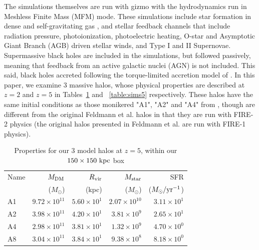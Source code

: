 The simulations themselves are run with {\sc gizmo} \citep{Hopkins2015} with the hydrodynamics run in Meshless Finite Mass (MFM) mode.
These simulations include star formation in dense and self-gravitating gas \citep{Hopkins2013}, and stellar feedback channels that include radiation pressure, photoionization, photoelectric heating, O-star and Asymptotic Giant Branch (AGB) driven stellar winds, and Type I and II Supernovae.
Supermassive black holes are included in the simulations, but followed passively, meaning that feedback from an active galactic nuclei (AGN) is not included.
This said, black holes accreted following the torque-limited accretion model of \citet{Anglesalcazar2017a,Anglesalcazar2017b}.
In this paper, we examine $3$ massive halos, whose physical properties are described at $z=2$ and $z=5$ in Tables~\ref{table:sims2} and ~\ref{table:sims5} respectively.
These halos have the same initial conditions as those monikered "A1", "A2" and "A4" from \citet{Feldmann2016}, though are different from the original Feldmann et al. halos in that they are run with FIRE-2 physics (the original halos presented in Feldmann et al. are run with FIRE-1 physics).

\begin{table}
\caption{Properties for our 3 model halos at $z=5$, within our $150 \times 150\ \rm kpc$ box}
\centering
\begin{tabular}{l r r r r}
Name & $M_{\rm DM}$ & $R_{\rm vir}$ & $M_{\rm star}$ & SFR \\
   & ($M_\odot$) & (kpc) & ($M_\odot$) & ($M_\odot / \rm yr ^{-1}$)\\ \hline
A1 & $9.72\times 10^{11}$ & $5.60 \times 10^1$  & $2.07 \times 10^{10}$ & $3.11\times10^1$ \\ \hline
A2 & $3.98\times 10^{11}$ & $4.20 \times 10^1$  & $3.81 \times 10^{9}$ & $2.65\times10^1$ \\ \hline
A4 & $2.98\times 10^{11}$ & $3.81 \times 10^1$  & $1.32 \times 10^{9}$ & $4.70\times10^0$ \\ \hline
A8 & $3.04\times 10^{11}$ & $3.84 \times 10^1$ & $9.38 \times 10^{8}$ & $8.18\times10^0$ \\
\hline
\end{tabular}
\label{table:sims2}
\end{table}

